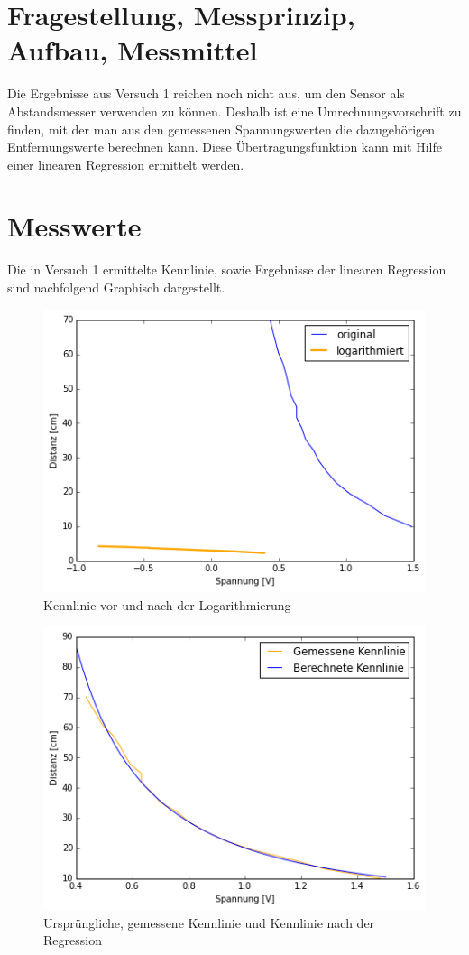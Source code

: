 \documentclass[12pt,oneside,a4paper]{report}
\begin{document}
\section{Fragestellung, Messprinzip, Aufbau, Messmittel}
\label{chap:VERSUCH_2_FRAGESTELLUNG}

Die Ergebnisse aus Versuch 1 reichen noch nicht aus, um den Sensor als Abstandsmesser verwenden zu können. Deshalb ist eine Umrechnungsvorschrift zu finden, mit der man aus den gemessenen Spannungswerten die dazugehörigen Entfernungswerte berechnen kann.
Diese Übertragungsfunktion kann mit Hilfe einer linearen Regression ermittelt werden.


\section{Messwerte}
\label{chap:VERSUCH_2_MESSWERTE}
Die in Versuch 1 ermittelte Kennlinie, sowie Ergebnisse der linearen Regression sind nachfolgend Graphisch dargestellt.
\begin{figure}
\centering\small
\includegraphics[scale=0.8]{src/Kennlinie2.png}
\caption{Kennlinie vor und nach der Logarithmierung}
\label{fig:KENNLINIE_LOG_ORIG}
\end{figure}
\begin{figure}
\centering\small
\includegraphics[scale=0.8]{src/Kennlinie1.png}
\caption{Ursprüngliche, gemessene Kennlinie und Kennlinie nach der Regression}
\label{fig:KENNLINIE_FINAL}
\end{figure}
\end{document}
